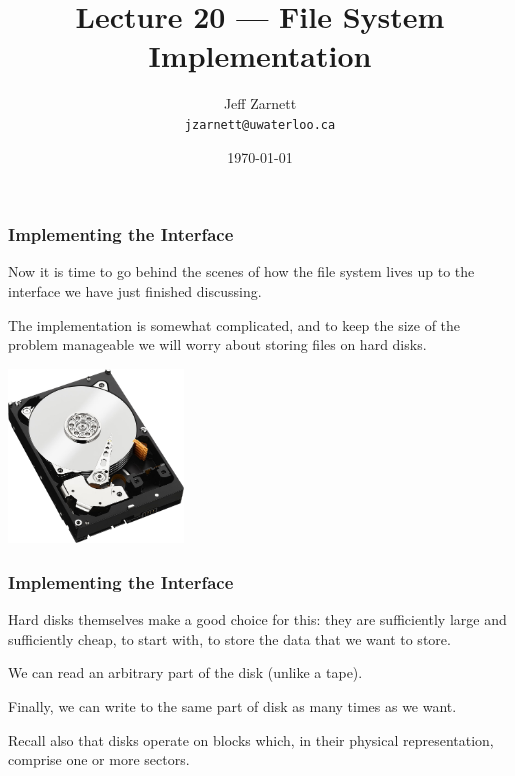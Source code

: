 

\title{Lecture 20 --- File System Implementation}

\author{Jeff Zarnett \\ \small \texttt{jzarnett@uwaterloo.ca}}
\date{\today}




\begin{frame}
  \titlepage

 \end{frame}



\begin{frame}
\frametitle{Implementing the Interface}

Now it is time to go behind the scenes of how the file system lives up to the interface we have just finished discussing. 

The implementation is somewhat complicated, and to keep the size of the problem manageable we will worry about storing files on hard disks.

\begin{center}
	\includegraphics[width=0.35\textwidth]{images/hdd.jpg}
\end{center}

 \end{frame}



\begin{frame}
\frametitle{Implementing the Interface}

 Hard disks themselves make a good choice for this: they are sufficiently large and sufficiently cheap, to start with, to store the data that we want to store. 
 
 We can read an arbitrary part of the disk (unlike a tape). 
 
Finally, we can write to the same part of disk as many times as we want. 
 
Recall also that disks operate on blocks which, in their physical representation, comprise one or more sectors.


\end{frame}

